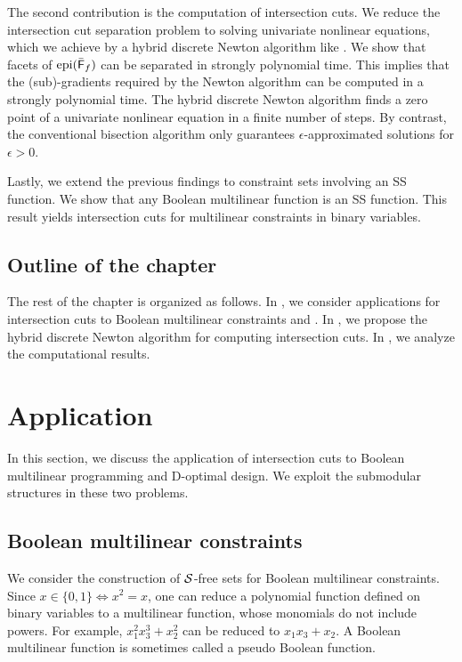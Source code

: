 The second contribution is  the computation of intersection cuts. We reduce the intersection cut separation problem to solving univariate nonlinear equations, which we achieve by a hybrid discrete Newton algorithm like \cite{Goemans}. We show that facets of $\operatorname{epi}(\bar{\mathsf F}_{f})$ can be separated in strongly polynomial time. This implies that the (sub)-gradients required by the  Newton algorithm can be computed in a strongly polynomial time. The hybrid discrete Newton algorithm finds a zero point of a univariate nonlinear equation  in a finite number of steps. By contrast, the conventional bisection algorithm  only guarantees $\epsilon$-approximated solutions for $\epsilon > 0$.
 

Lastly, we  extend the previous findings to constraint sets involving an SS function. We show that any Boolean multilinear function is an SS function. This result yields intersection cuts for multilinear constraints in binary variables.


\subsection{Outline of the chapter}
The rest of the chapter is organized as follows. In , we consider applications for intersection cuts to Boolean multilinear constraints and \bdopt. In , we propose the hybrid discrete Newton algorithm for computing intersection cuts. In , we analyze the computational results.


\section{Application}
\label{sec.app}
In this section, we discuss the application of intersection cuts to Boolean multilinear programming and D-optimal design. We exploit the submodular structures in these two problems.


\subsection{Boolean multilinear constraints}
\label{sec.bmc}
We consider the construction of $\mathcal S$-free sets for Boolean multilinear constraints.
Since $x\in\{0,1\}\Leftrightarrow x^2=x$, one can reduce a  polynomial function defined on binary variables to a  multilinear  function, whose monomials do not include powers. For example, $x_1^2x_3^3+x_2^2$ can be reduced to $x_1x_3+x_2$.   A Boolean multilinear function is sometimes called a pseudo Boolean function.


